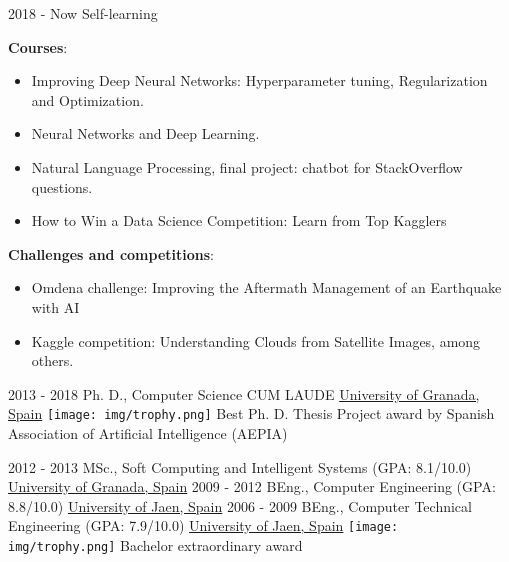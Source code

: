 \documentclass[letterpaper]{twentysecondcv} %
\begin{document}
\begin{twenty} %
	\twentyitem
    	{2018 - Now}
        {}
        {Self-learning}
        {}
        {\textbf{Courses}: \begin{itemize}
        	\item Improving Deep Neural Networks: Hyperparameter tuning, Regularization and Optimization.
        	\item Neural Networks and Deep Learning.
			\item Natural Language Processing, final project: chatbot for StackOverflow questions.
			\item How to Win a Data Science Competition: Learn from Top Kagglers
        \end{itemize}}
        {\textbf{Challenges and competitions}:
        	\begin{itemize}
        		\item Omdena challenge: Improving the Aftermath Management of an Earthquake with AI
        		\item Kaggle competition: Understanding Clouds from Satellite Images, among others.
        	\end{itemize}
        }
       
	\twentyitem
    	{2013 - 2018}
        {}
        {Ph. D., Computer Science \textnormal{CUM LAUDE}}
        {\href{http://www.ugr.es/}{University of Granada, Spain}}
        {{\texttt{[image: img/trophy.png]}} Best Ph. D. Thesis Project award by Spanish Association of
Artificial Intelligence (AEPIA)}
        {}
	
	\twentyitem
    	{2012 - 2013}
        {}
        {MSc., Soft Computing and Intelligent Systems \textnormal{(GPA: 8.1/10.0)}}
        {\href{http://www.ugr.es/}{University of Granada, Spain}}
        {}
        {}
	\twentyitem
    	{2009 - 2012}
		{}
        {BEng., Computer Engineering \textnormal{(GPA: 8.8/10.0)}}
        {\href{http://www.ujaen.es/}{University of Jaen, Spain}}
        {}
        {}
   \twentyitem
    	{2006 - 2009}
		{}
        {BEng., Computer Technical Engineering \textnormal{(GPA: 7.9/10.0)}}
        {\href{http://www.ujaen.es/}{University of Jaen, Spain}}
        {{\texttt{[image: img/trophy.png]}} Bachelor extraordinary award}
        {}
\end{twenty}

\end{document}
